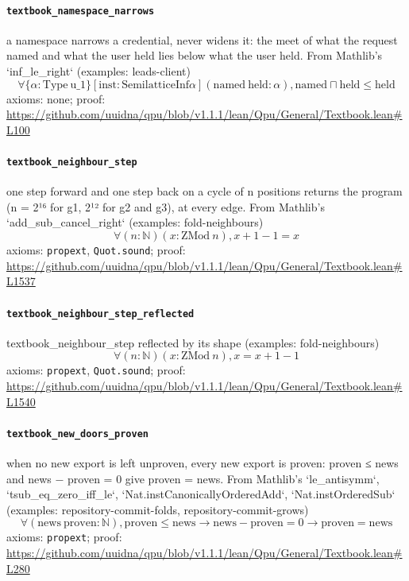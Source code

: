 \documentclass[11pt]{article}
\begin{document}
\paragraph{\texttt{textbook\_namespace\_narrows}}
a namespace narrows a credential, never widens it: the meet of what the request named and what the user held lies below what the user held. From Mathlib's `inf\_le\_right` (examples: leads-client)
\[ \forall \{\alpha : \mathrm{Type}\ \mathrm{u\_1}\} [\mathrm{inst} : \mathrm{SemilatticeInf} \alpha ] (\mathrm{named}\ \mathrm{held} : \alpha ), \mathrm{named} \sqcap \mathrm{held} \le \mathrm{held} \]
\noindent axioms: none; proof: \url{https://github.com/uuidna/qpu/blob/v1.1.1/lean/Qpu/General/Textbook.lean\#L100}

\paragraph{\texttt{textbook\_neighbour\_step}}
one step forward and one step back on a cycle of n positions returns the program (n = 2¹⁶ for g1, 2¹² for g2 and g3), at every edge. From Mathlib's `add\_sub\_cancel\_right` (examples: fold-neighbours)
\[ \forall (n : \mathbb{N}) (x : \mathrm{ZMod}\ n), x + 1 - 1 = x \]
\noindent axioms: \texttt{propext}, \texttt{Quot.sound}; proof: \url{https://github.com/uuidna/qpu/blob/v1.1.1/lean/Qpu/General/Textbook.lean\#L1537}

\paragraph{\texttt{textbook\_neighbour\_step\_reflected}}
textbook\_neighbour\_step reflected by its shape (examples: fold-neighbours)
\[ \forall (n : \mathbb{N}) (x : \mathrm{ZMod}\ n), x = x + 1 - 1 \]
\noindent axioms: \texttt{propext}, \texttt{Quot.sound}; proof: \url{https://github.com/uuidna/qpu/blob/v1.1.1/lean/Qpu/General/Textbook.lean\#L1540}

\paragraph{\texttt{textbook\_new\_doors\_proven}}
when no new export is left unproven, every new export is proven: proven ≤ news and news − proven = 0 give proven = news. From Mathlib's `le\_antisymm`, `tsub\_eq\_zero\_iff\_le`, `Nat.instCanonicallyOrderedAdd`, `Nat.instOrderedSub` (examples: repository-commit-folds, repository-commit-grows)
\[ \forall (\mathrm{news}\ \mathrm{proven} : \mathbb{N}), \mathrm{proven} \le \mathrm{news} \to \mathrm{news} - \mathrm{proven} = 0 \to \mathrm{proven} = \mathrm{news} \]
\noindent axioms: \texttt{propext}; proof: \url{https://github.com/uuidna/qpu/blob/v1.1.1/lean/Qpu/General/Textbook.lean\#L280}
\end{document}
